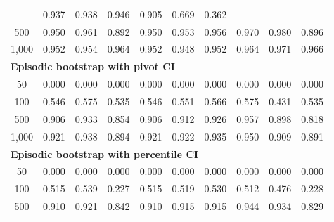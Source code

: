 \documentclass{article}
\numberwithin{equation}{section}
\begin{document}
\begin{table}[ht]
\begin{tabular}{c|ccc|cccccc}
& \cellcolor{covheat!94!white}0.937 & \cellcolor{covheat!94!white}0.938 & \cellcolor{covheat!98!white}0.946 & \cellcolor{covheat!78!white}0.905 & 0.669 & 0.362 \\
500
& \cellcolor{covheat!100!white}0.950 & \cellcolor{covheat!100!white}0.961 & \cellcolor{covheat!71!white}0.892
& \cellcolor{covheat!100!white}0.950 & \cellcolor{covheat!100!white}0.953 & \cellcolor{covheat!100!white}0.956 & \cellcolor{covheat!100!white}0.970 & \cellcolor{covheat!100!white}0.980 & \cellcolor{covheat!73!white}0.896 \\
1{,}000
& \cellcolor{covheat!100!white}0.952 & \cellcolor{covheat!100!white}0.954 & \cellcolor{covheat!100!white}0.964
& \cellcolor{covheat!100!white}0.952 & \cellcolor{covheat!99!white}0.948 & \cellcolor{covheat!100!white}0.952 & \cellcolor{covheat!100!white}0.964 & \cellcolor{covheat!100!white}0.971 & \cellcolor{covheat!100!white}0.966 \\
\hline
\multicolumn{10}{l}{\textbf{Episodic bootstrap with pivot CI}} \\ \hline
50
& 0.000 & 0.000 & 0.000
& 0.000 & 0.000 & 0.000 & 0.000 & 0.000 & 0.000 \\
100
& 0.546 & 0.575 & 0.535
& 0.546 & 0.551 & 0.566 & 0.575 & 0.431 & 0.535 \\
500
& \cellcolor{covheat!78!white}0.906 & \cellcolor{covheat!92!white}0.933 & \cellcolor{covheat!52!white}0.854
& \cellcolor{covheat!78!white}0.906 & \cellcolor{covheat!81!white}0.912 & \cellcolor{covheat!88!white}0.926 & \cellcolor{covheat!100!white}0.957 & \cellcolor{covheat!74!white}0.898 & \cellcolor{covheat!34!white}0.818 \\
1{,}000
& \cellcolor{covheat!86!white}0.921 & \cellcolor{covheat!94!white}0.938 & \cellcolor{covheat!72!white}0.894
& \cellcolor{covheat!86!white}0.921 & \cellcolor{covheat!86!white}0.922 & \cellcolor{covheat!93!white}0.935 & \cellcolor{covheat!100!white}0.950 & \cellcolor{covheat!80!white}0.909 & \cellcolor{covheat!71!white}0.891 \\
\hline
\multicolumn{10}{l}{\textbf{Episodic bootstrap with percentile CI}} \\ \hline
50
& 0.000 & 0.000 & 0.000
& 0.000 & 0.000 & 0.000 & 0.000 & 0.000 & 0.000 \\
100
& 0.515 & 0.539 & 0.227
& 0.515 & 0.519 & 0.530 & 0.512 & 0.476 & 0.228 \\
500
& \cellcolor{covheat!80!white}0.910 & \cellcolor{covheat!86!white}0.921 & \cellcolor{covheat!46!white}0.842
& \cellcolor{covheat!80!white}0.910 & \cellcolor{covheat!83!white}0.915 & \cellcolor{covheat!83!white}0.915 & \cellcolor{covheat!97!white}0.944 & \cellcolor{covheat!92!white}0.934 & \cellcolor{covheat!39!white}0.829 \\

\end{tabular}
\end{table}
\end{document}
